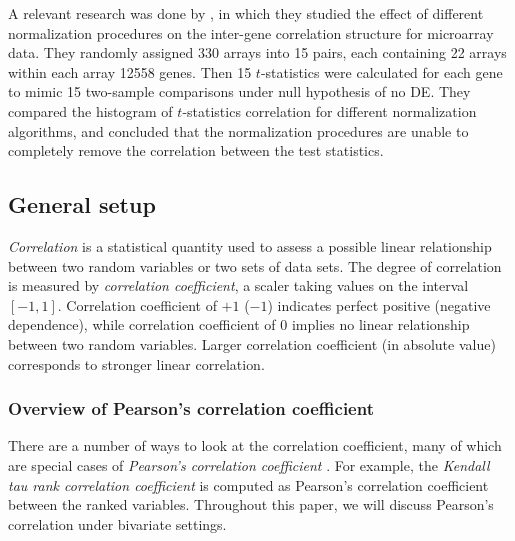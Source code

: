 	
	A relevant research was done by \citet{qiu2005effects}, in which they studied the effect of 
	different
	normalization procedures on the inter-gene correlation structure for microarray data. They 
	randomly
	assigned 330 arrays into 15 pairs, each containing 22 arrays within each array 12558 genes. 
	Then 15
	$t$-statistics were calculated for each gene to mimic 15 two-sample comparisons under null
	hypothesis of no DE. They compared the histogram of $t$-statistics correlation for different
	normalization algorithms, and concluded that the normalization procedures are unable to 
	completely
	remove the correlation between the test statistics. %
	
	
	
	
	
	
	
	\subsection{General setup}
		\textit{Correlation} is a statistical quantity used to assess a possible linear 
		relationship 
		between two random variables or two sets of 
		data sets. The degree of correlation is measured by \textit{correlation coefficient}, a 
		scaler 
		taking values on the interval $[-1, 1]$. 
		Correlation coefficient of $+1$ ($-1$) indicates perfect positive (negative dependence), 
		while 
		correlation coefficient of 0 implies no linear 
		relationship between two random variables. Larger correlation coefficient (in absolute 
		value) 
		corresponds to stronger linear correlation. 
		
	\subsubsection{Overview of Pearson's correlation coefficient}

	There are a number of ways to look at the correlation coefficient, many of which are special 
	cases of \textit{Pearson's correlation coefficient} 
	\citep{lee1988thirteen}. For example, the \textit{Kendall tau rank correlation coefficient} is 
	computed as Pearson's correlation coefficient between the ranked variables. Throughout this 
	paper, we will discuss Pearson's correlation under bivariate settings. 
	

